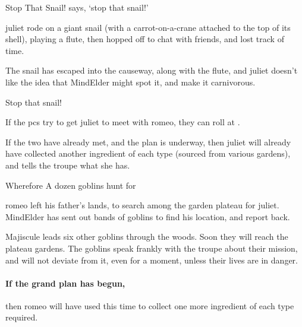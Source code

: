 {Stop That Snail!}%
{ says, `stop that snail!'}%

\Gls{juliet} rode on a giant snail (with a carrot-on-a-crane attached to the top of its shell), playing a flute, then hopped off to chat with friends, and lost track of time.

The snail has escaped into the causeway, along with the flute, and \gls{juliet} doesn't like the idea that \gls{MindElder} might spot it, and make it carnivorous.

\begin{speechtext}
  Stop that snail!
\end{speechtext}

If the \glspl{pc} try to get \gls{juliet} to meet with \gls{romeo},
they can roll  at \tn[5].

If the two have already met, and the plan is underway,
then \gls{juliet} will already have collected another \gls{ingredient} of each type (sourced from various gardens), and tells the troupe what she has.

{Wherefore}%
{A dozen goblins hunt for }%

\Gls{romeo} left his father's lands, to search among the garden plateau for \gls{juliet}.
\Gls{MindElder} has sent out bands of goblins to find his location, and report back.

Majiscule leads six other goblins through the woods.
Soon they will reach the plateau gardens.
The goblins speak frankly with the troupe about their mission, and will not deviate from it, even for a moment, unless their lives are in danger.

\paragraph{If the grand plan has begun,}
then \gls{romeo} will have used this time to collect one more \gls{ingredient} of each type required.

